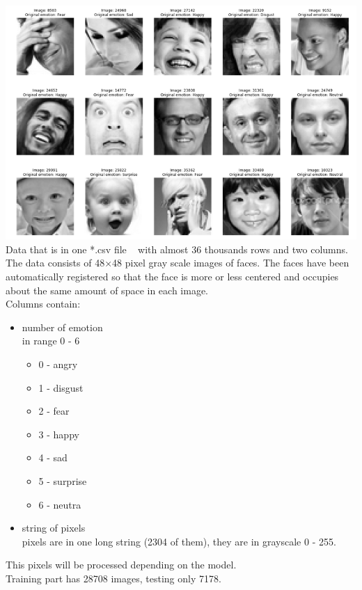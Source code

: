 \includegraphics[scale=0.75]{images/ferCover.png}
\\Data that is in one *.csv file ~\cite{kaggleFER} with almost 36 thousands rows and two columns. The data consists of 48×48 pixel gray scale images of faces. The faces have been automatically registered so that the face is more or less centered and occupies about the same amount of space in each image.
\\Columns contain:
\begin{itemize}
  \item number of emotion \\
        in range 0 - 6
        \begin{itemize}
          \item 0 - angry
          \item 1 - disgust
          \item 2 - fear
          \item 3 - happy
          \item 4 - sad
          \item 5 - surprise
          \item 6 - neutra
        \end{itemize}
  \item string of pixels \\
        pixels are in one long string (2304 of them), they are in grayscale 0 - 255.\\
\end{itemize}
This pixels will be processed depending on the model.\\
Training part has 28708 images, testing only 7178.
